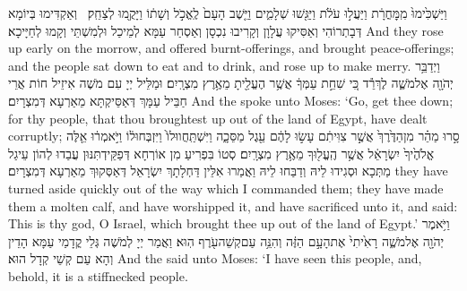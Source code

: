 {וַיַּשְׁכִּ֙ימוּ֙ מִֽמׇּחֳרָ֔ת וַיַּעֲל֣וּ עֹלֹ֔ת וַיַּגִּ֖שׁוּ שְׁלָמִ֑ים וַיֵּ֤שֶׁב הָעָם֙ לֶֽאֱכֹ֣ל וְשָׁת֔וֹ וַיָּקֻ֖מוּ לְצַחֵֽק׃ \petucha }
{וְאַקְדִּימוּ בְּיוֹמָא דְּבָתְרוֹהִי וְאַסִּיקוּ עֲלָוָן וְקָרִיבוּ נִכְסָן וְאַסְחַר עַמָּא לְמֵיכַל וּלְמִשְׁתֵּי וְקָמוּ לְחַיָּיכָא׃}
{And they rose up early on the morrow, and offered burnt-offerings, and brought peace-offerings; and the people sat down to eat and to drink, and rose up to make merry.}{}
{וַיְדַבֵּ֥ר יְהֹוָ֖ה אֶל\maqqaf מֹשֶׁ֑ה לֶךְ\maqqaf רֵ֕ד כִּ֚י שִׁחֵ֣ת עַמְּךָ֔ אֲשֶׁ֥ר הֶעֱלֵ֖יתָ מֵאֶ֥רֶץ מִצְרָֽיִם׃}
{וּמַלֵּיל יְיָ עִם מֹשֶׁה אִיזֵיל חוֹת אֲרֵי חַבֵּיל עַמָּךְ דְּאַסֵּיקְתָּא מֵאַרְעָא דְּמִצְרָיִם׃}
{And the \lord\space spoke unto Moses: ‘Go, get thee down; for thy people, that thou broughtest up out of the land of Egypt, have dealt corruptly;}{}
{סָ֣רוּ מַהֵ֗ר מִן\maqqaf הַדֶּ֙רֶךְ֙ אֲשֶׁ֣ר צִוִּיתִ֔ם עָשׂ֣וּ לָהֶ֔ם עֵ֖גֶל מַסֵּכָ֑ה וַיִּשְׁתַּֽחֲווּ\maqqaf לוֹ֙ וַיִּזְבְּחוּ\maqqaf ל֔וֹ וַיֹּ֣אמְר֔וּ אֵ֤לֶּה אֱלֹהֶ֙יךָ֙ יִשְׂרָאֵ֔ל אֲשֶׁ֥ר הֶֽעֱל֖וּךָ מֵאֶ֥רֶץ מִצְרָֽיִם׃}
{סְטוֹ בִּפְרִיעַ מִן אוֹרְחָא דְּפַקֵּידְתִּנּוּן עֲבַדוּ לְהוֹן עֵיגַל מַתְּכָא וּסְגִידוּ לֵיהּ וְדַבַּחוּ לֵיהּ וַאֲמַרוּ אִלֵּין דַּחְלָתָךְ יִשְׂרָאֵל דְּאַסְּקוּךְ מֵאַרְעָא דְּמִצְרָיִם׃}
{they have turned aside quickly out of the way which I commanded them; they have made them a molten calf, and have worshipped it, and have sacrificed unto it, and said: This is thy god, O Israel, which brought thee up out of the land of Egypt.’}{}
{וַיֹּ֥אמֶר יְהֹוָ֖ה אֶל\maqqaf מֹשֶׁ֑ה רָאִ֙יתִי֙ אֶת\maqqaf הָעָ֣ם הַזֶּ֔ה וְהִנֵּ֥ה עַם\maqqaf קְשֵׁה\maqqaf עֹ֖רֶף הֽוּא׃}
{וַאֲמַר יְיָ לְמֹשֶׁה גְּלֵי קֳדָמַי עַמָּא הָדֵין וְהָא עַם קְשֵׁי קְדָל הוּא׃}
{And the \lord\space said unto Moses: ‘I have seen this people, and, behold, it is a stiffnecked people.}{}
